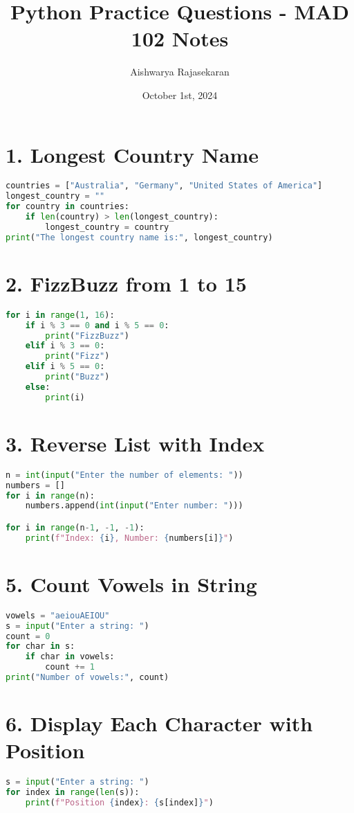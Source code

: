 \documentclass{article}
\title{Python Practice Questions - MAD 102 Notes}
\author{Aishwarya Rajasekaran}
\date{October 1st, 2024}
\begin{document}
\maketitle

\section*{1. Longest Country Name}
\begin{lstlisting}[language=Python]
countries = ["Australia", "Germany", "United States of America"]
longest_country = ""
for country in countries:
    if len(country) > len(longest_country):
        longest_country = country
print("The longest country name is:", longest_country)
\end{lstlisting}

\section*{2. FizzBuzz from 1 to 15}
\begin{lstlisting}[language=Python]
for i in range(1, 16):
    if i % 3 == 0 and i % 5 == 0:
        print("FizzBuzz")
    elif i % 3 == 0:
        print("Fizz")
    elif i % 5 == 0:
        print("Buzz")
    else:
        print(i)
\end{lstlisting}

\section*{3. Reverse List with Index}
\begin{lstlisting}[language=Python]
n = int(input("Enter the number of elements: "))
numbers = []
for i in range(n):
    numbers.append(int(input("Enter number: ")))

for i in range(n-1, -1, -1):
    print(f"Index: {i}, Number: {numbers[i]}")
\end{lstlisting}

\section*{5. Count Vowels in String}
\begin{lstlisting}[language=Python]
vowels = "aeiouAEIOU"
s = input("Enter a string: ")
count = 0
for char in s:
    if char in vowels:
        count += 1
print("Number of vowels:", count)
\end{lstlisting}

\section*{6. Display Each Character with Position}
\begin{lstlisting}[language=Python]
s = input("Enter a string: ")
for index in range(len(s)):
    print(f"Position {index}: {s[index]}")
\end{lstlisting}
\end{document}
